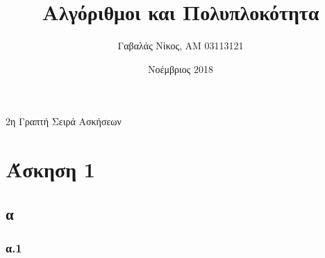 \documentclass[12pt,a4paper]{article}
\title{Αλγόριθμοι και Πολυπλοκότητα}
\author{Γαβαλάς Νίκος, AM 03113121}
\date{Νοέμβριος 2018}
\begin{document}
  \maketitle

  \begin{center}
    \Large{2η Γραπτή Σειρά Ασκήσεων}
  \end{center}

  \section{Άσκηση 1}

  \subsection{α}
  
  \subsubsection{α.1}
\end{document}
